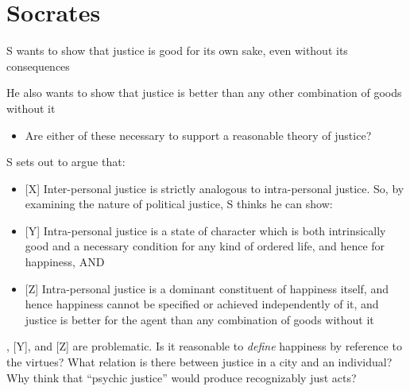 \documentclass[11pt]{article}
\begin{document}
\section*{Socrates}

\noindent S wants to show that justice is good for its own sake, even without its consequences
\vspace*{2mm}

\noindent He also wants to show that justice is better than any other combination of goods without it
\begin{itemize}\item{Are either of these necessary to support a reasonable theory of justice?}\end{itemize}

\noindent S sets out to argue that:
\begin{itemize}\item{[X] Inter-personal justice is strictly analogous to intra-personal justice. So, by examining the nature of political justice, S thinks he can show:}\item{[Y] Intra-personal justice is a state of character which is both intrinsically good and a necessary condition for any kind of ordered life, and hence for happiness, AND}\item{[Z] Intra-personal justice is a dominant constituent of happiness itself, and hence happiness cannot be specified or achieved independently of it, and justice is better for the agent than any combination of goods without it}\end{itemize}

\noindent [X], [Y], and [Z] are problematic. Is it reasonable to \emph{define} happiness by reference to the virtues? What relation is there between justice in a city and an individual? Why think that ``psychic justice'' would produce recognizably just acts?
\end{document}

